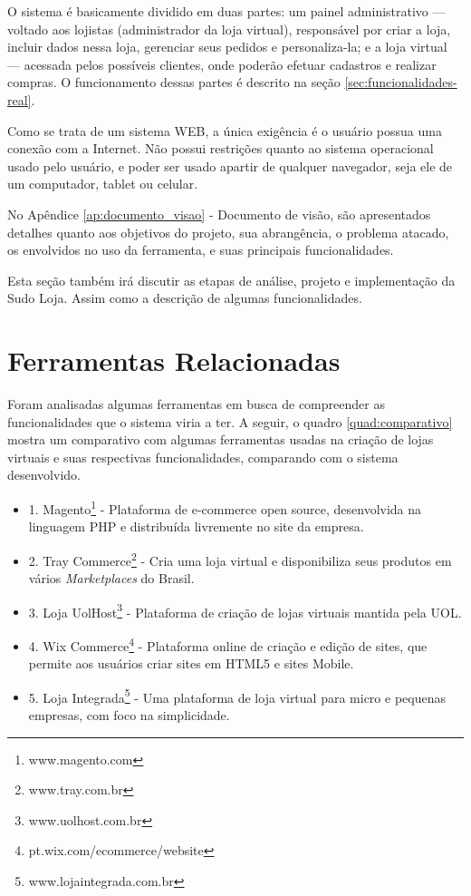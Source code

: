 \documentclass[a4paper,12pt]{monografia}
\begin{document}
O sistema é basicamente dividido em duas partes: um painel administrativo --- voltado aos lojistas (administrador da loja virtual), responsável por criar a loja, incluir dados nessa loja, gerenciar seus pedidos e personaliza-la; e a loja virtual --- acessada pelos possíveis clientes, onde poderão efetuar cadastros e realizar compras. O funcionamento dessas partes é descrito na seção \ref{sec:funcionalidades-real}.

Como se trata de um sistema WEB, a única exigência é o usuário possua uma conexão com a Internet. Não possui restrições quanto ao sistema operacional usado pelo usuário, e poder ser usado apartir de qualquer navegador, seja ele de um computador, tablet ou celular.

No Apêndice \ref{ap:documento_visao} - Documento de visão, são apresentados detalhes quanto aos objetivos do projeto, sua abrangência, o problema atacado, os envolvidos no uso da ferramenta, e suas principais funcionalidades.

Esta seção também irá discutir as etapas de análise, projeto e implementação da Sudo Loja. Assim como a descrição de algumas funcionalidades.

\section{Ferramentas Relacionadas} %
\label{sec:ferramentas_relacionadas}

Foram analisadas algumas ferramentas em busca de compreender as funcionalidades que o sistema viria a ter. A seguir, o quadro \ref{quad:comparativo} mostra um comparativo com algumas ferramentas usadas na criação de lojas virtuais e suas respectivas funcionalidades, comparando com o sistema desenvolvido.

\begin{itemize}
\item 1. Magento\footnote{www.magento.com}  -  Plataforma de e-commerce open source, desenvolvida na linguagem PHP e distribuída livremente no site da empresa. \nocite{magento}
\item 2. Tray Commerce\footnote{www.tray.com.br} - Cria uma loja virtual e disponibiliza seus produtos em vários \textit{Marketplaces} do Brasil. \nocite{tray}
\item 3. Loja UolHost\footnote{www.uolhost.com.br} - Plataforma de criação de lojas virtuais mantida pela UOL. \nocite{uolhost}
\item 4. Wix Commerce\footnote{pt.wix.com/ecommerce/website} - Plataforma online de criação e edição de sites, que permite aos usuários criar sites em HTML5 e sites Mobile.  \nocite{wix}
\item 5. Loja Integrada\footnote{www.lojaintegrada.com.br} - Uma plataforma de loja virtual para micro e pequenas empresas, com foco na simplicidade. \nocite{lojaintegrada}

\end{itemize}
\end{document}
